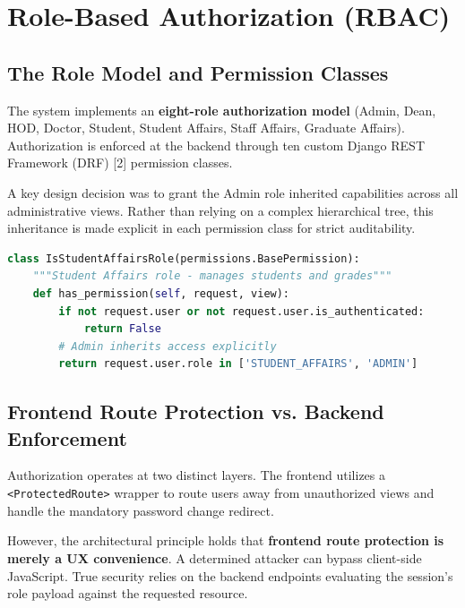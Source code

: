 \section{Role-Based Authorization (RBAC)}
\label{sec:rbac}

\subsection{The Role Model and Permission Classes}

The system implements an \textbf{eight-role authorization model} (Admin, Dean, HOD, Doctor, Student, Student Affairs, Staff Affairs, Graduate Affairs). Authorization is enforced at the backend through ten custom Django REST Framework (DRF) [2] permission classes. 

A key design decision was to grant the Admin role inherited capabilities across all administrative views. Rather than relying on a complex hierarchical tree, this inheritance is made explicit in each permission class for strict auditability.

\begin{lstlisting}[language=Python, caption=Explicit Role Inheritance (\texttt{permissions.py})]
class IsStudentAffairsRole(permissions.BasePermission):
    """Student Affairs role - manages students and grades"""
    def has_permission(self, request, view):
        if not request.user or not request.user.is_authenticated:
            return False
        # Admin inherits access explicitly
        return request.user.role in ['STUDENT_AFFAIRS', 'ADMIN']
\end{lstlisting}

\subsection{Frontend Route Protection vs. Backend Enforcement}

Authorization operates at two distinct layers. The frontend utilizes a \texttt{\textless ProtectedRoute\textgreater} wrapper to route users away from unauthorized views and handle the mandatory password change redirect.

However, the architectural principle holds that \textbf{frontend route protection is merely a UX convenience}. A determined attacker can bypass client-side JavaScript. True security relies on the backend endpoints evaluating the session's role payload against the requested resource.

